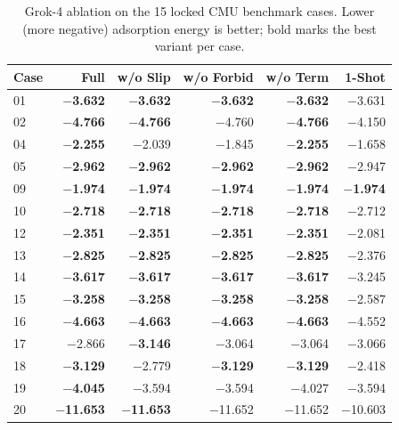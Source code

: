 \documentclass[%
 preprint,
 superscriptaddress,
 amsmath,amssymb,
 aps,
 prb,
 floatfix,
]{revtex4-2}
\begin{document}
\begin{table}[ht]
\centering
\small
\caption{Grok-4 ablation on the 15 locked CMU benchmark cases. Lower (more negative) adsorption energy is better; bold marks the best variant per case.}
\label{tab:si-ablation-grok}
\begin{tabular}{lrrrrr}
\toprule
Case & Full & w/o Slip & w/o Forbid & w/o Term & 1-Shot \\
\midrule
01 & \textbf{$-$3.632} & \textbf{$-$3.632} & \textbf{$-$3.632} & \textbf{$-$3.632} & $-$3.631 \\
02 & \textbf{$-$4.766} & \textbf{$-$4.766} & $-$4.760 & \textbf{$-$4.766} & $-$4.150 \\
04 & \textbf{$-$2.255} & $-$2.039 & $-$1.845 & \textbf{$-$2.255} & $-$1.658 \\
05 & \textbf{$-$2.962} & \textbf{$-$2.962} & \textbf{$-$2.962} & \textbf{$-$2.962} & $-$2.947 \\
09 & \textbf{$-$1.974} & \textbf{$-$1.974} & \textbf{$-$1.974} & \textbf{$-$1.974} & \textbf{$-$1.974} \\
10 & \textbf{$-$2.718} & \textbf{$-$2.718} & \textbf{$-$2.718} & \textbf{$-$2.718} & $-$2.712 \\
12 & \textbf{$-$2.351} & \textbf{$-$2.351} & \textbf{$-$2.351} & \textbf{$-$2.351} & $-$2.081 \\
13 & \textbf{$-$2.825} & \textbf{$-$2.825} & \textbf{$-$2.825} & \textbf{$-$2.825} & $-$2.376 \\
14 & \textbf{$-$3.617} & \textbf{$-$3.617} & \textbf{$-$3.617} & \textbf{$-$3.617} & $-$3.245 \\
15 & \textbf{$-$3.258} & \textbf{$-$3.258} & \textbf{$-$3.258} & \textbf{$-$3.258} & $-$2.587 \\
16 & \textbf{$-$4.663} & \textbf{$-$4.663} & \textbf{$-$4.663} & \textbf{$-$4.663} & $-$4.552 \\
17 & $-$2.866 & \textbf{$-$3.146} & $-$3.064 & $-$3.064 & $-$3.066 \\
18 & \textbf{$-$3.129} & $-$2.779 & \textbf{$-$3.129} & \textbf{$-$3.129} & $-$2.418 \\
19 & \textbf{$-$4.045} & $-$3.594 & $-$3.594 & $-$4.027 & $-$3.594 \\
20 & \textbf{$-$11.653} & \textbf{$-$11.653} & $-$11.652 & $-$11.652 & $-$10.603 \\
\bottomrule
\end{tabular}
\end{table}
\end{document}
